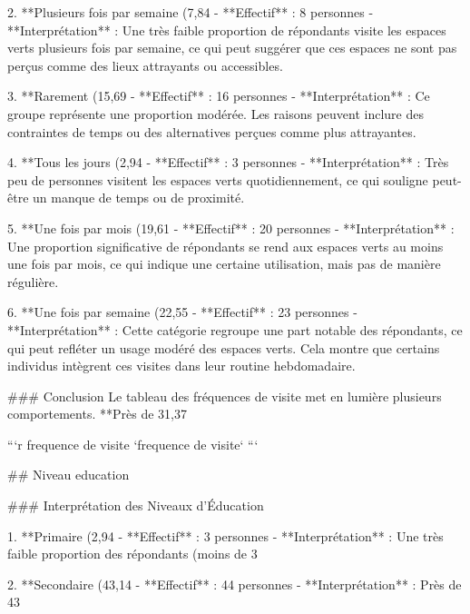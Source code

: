 2. **Plusieurs fois par semaine (7,84%
   - **Effectif** : 8 personnes
   - **Interprétation** : Une très faible proportion de répondants visite les espaces verts plusieurs fois par semaine, ce qui peut suggérer que ces espaces ne sont pas perçus comme des lieux attrayants ou accessibles.

3. **Rarement (15,69%
   - **Effectif** : 16 personnes
   - **Interprétation** : Ce groupe représente une proportion modérée. Les raisons peuvent inclure des contraintes de temps ou des alternatives perçues comme plus attrayantes.

4. **Tous les jours (2,94%
   - **Effectif** : 3 personnes
   - **Interprétation** : Très peu de personnes visitent les espaces verts quotidiennement, ce qui souligne peut-être un manque de temps ou de proximité.

5. **Une fois par mois (19,61%
   - **Effectif** : 20 personnes
   - **Interprétation** : Une proportion significative de répondants se rend aux espaces verts au moins une fois par mois, ce qui indique une certaine utilisation, mais pas de manière régulière.

6. **Une fois par semaine (22,55%
   - **Effectif** : 23 personnes
   - **Interprétation** : Cette catégorie regroupe une part notable des répondants, ce qui peut refléter un usage modéré des espaces verts. Cela montre que certains individus intègrent ces visites dans leur routine hebdomadaire.

### Conclusion
Le tableau des fréquences de visite met en lumière plusieurs comportements. **Près de 31,37%


```{r frequence de visite}
`frequence de visite`
```

## Niveau education

### Interprétation des Niveaux d'Éducation

1. **Primaire (2,94%
   - **Effectif** : 3 personnes
   - **Interprétation** : Une très faible proportion des répondants (moins de 3%

2. **Secondaire (43,14%
   - **Effectif** : 44 personnes
   - **Interprétation** : Près de 43%

